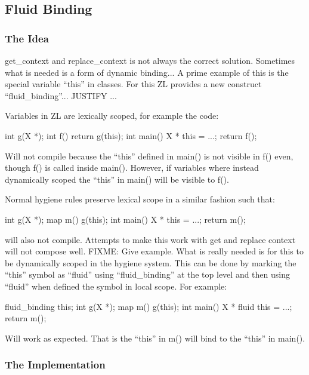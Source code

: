 \documentclass[12pt,english,letterpaper]{article}
\begin{document}
\subsection{Fluid Binding}

\subsubsection{The Idea}

get\_context and replace\_context is not always the correct solution.
Sometimes what is needed is a form of dynamic binding...  A prime
example of this is the special variable ``this'' in classes.  For this
ZL provides a new construct ``fluid\_binding''... JUSTIFY ...

Variables in ZL are lexically scoped, for example the code:

\begin{code}
int g(X *);
int f() {return g(this);}
int main() {X * this = ...; return f();}
\end{code}

Will not compile because the ``this'' defined in main() is not visible in
f() even, though f() is called inside main().  However, if variables
where instead dynamically scoped the ``this'' in main() will be visible
to f().  

Normal hygiene rules preserve lexical scope in a similar fashion such that:

\begin{code}
int g(X *);
map m() {g(this);}
int main() {X * this = ...; return m();}
\end{code}

will also not compile.  Attempts to make this work with get and
replace context will not compose well.  FIXME: Give example. What is
really needed is for this to be dynamically scoped in the hygiene
system.  This can be done by marking the ``this'' symbol as ``fluid''
using ``fluid\_binding'' at the top level and then using ``fluid''
when defined the symbol in local scope.  For example:

\begin{code}
fluid_binding this;
int g(X *);
map m() {g(this);}
int main() {X * fluid this = ...; return m();}
\end{code}

Will work as expected.  That is the ``this'' in m() will bind to the
``this'' in main(). 

\subsubsection{The Implementation}
\end{document}
